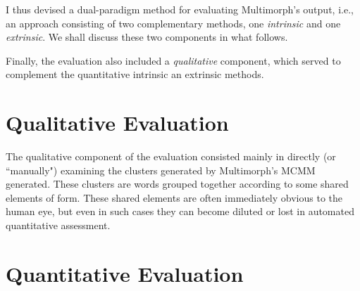 
I thus devised a dual-paradigm method for evaluating Multimorph's output, i.e., an approach consisting of two complementary methods, %
one \emph{intrinsic} and one \emph{extrinsic}. We shall discuss these two components in what follows.

Finally, the evaluation also included a \emph{qualitative} component, which served to complement the quantitative 
 intrinsic an extrinsic methods.


\section{Qualitative Evaluation}
The qualitative component of the evaluation consisted mainly in directly (or ``manually") examining the clusters generated by Multimorph's MCMM generated. These clusters are words grouped together according to some shared elements of form. These shared elements are often immediately obvious to the human eye, but even in such cases they can become diluted or lost in automated quantitative assessment.   %

\section{Quantitative Evaluation}
